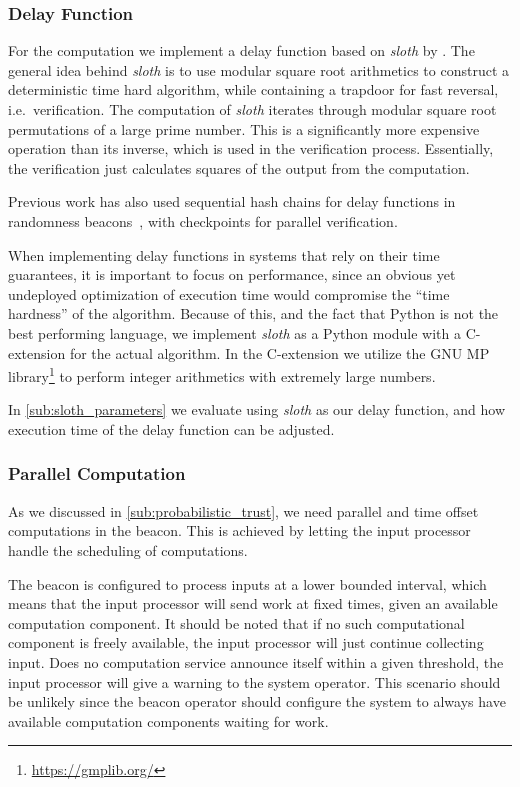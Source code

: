 \subsubsection{Delay Function}%
\label{ssub:delay_function}
For the computation we implement a delay function based on \textit{sloth} by \citet{randomzoo}.
The general idea behind \textit{sloth} is to use modular square root arithmetics to construct a deterministic time hard algorithm, while containing a trapdoor for fast reversal, i.e.\ verification.
The computation of \textit{sloth} iterates through modular square root permutations of a large prime number.
This is a significantly more expensive operation than its inverse, which is used in the verification process.
Essentially, the verification just calculates squares of the output from the computation.

Previous work has also used sequential hash chains for delay functions in randomness beacons~\cite{bunz2017proofsof}, with checkpoints for parallel verification.

When implementing delay functions in systems that rely on their time guarantees, it is important to focus on performance, since an obvious yet undeployed optimization of execution time would compromise the \enquote{time hardness} of the algorithm.
Because of this, and the fact that Python is not the best performing language, we implement \textit{sloth} as a Python module with a C-extension for the actual algorithm.
In the C-extension we utilize the GNU MP library\footnote{\url{https://gmplib.org/}} to perform integer arithmetics with extremely large numbers.

In \vref{sub:sloth_parameters} we evaluate using \textit{sloth} as our delay function, and how execution time of the delay function can be adjusted.

\subsubsection{Parallel Computation}%
\label{ssub:parallel_computation}
As we discussed in \cref{sub:probabilistic_trust}, we need parallel and time offset computations in the beacon.
This is achieved by letting the input processor handle the scheduling of computations.

The beacon is configured to process inputs at a lower bounded interval, which means that the input processor will send work at fixed times, given an available computation component.
It should be noted that if no such computational component is freely available, the input processor will just continue collecting input.
Does no computation service announce itself within a given threshold, the input processor will give a warning to the system operator.
This scenario should be unlikely since the beacon operator should configure the system to always have available computation components waiting for work.

